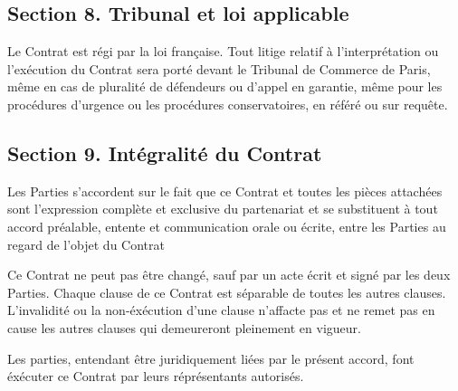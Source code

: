 \documentclass[]{article}
\begin{document}
\hypertarget{section-8.-tribunal-et-loi-applicable}{%
\subsection{Section 8. Tribunal et loi
applicable}\label{section-8.-tribunal-et-loi-applicable}}

Le Contrat est régi par la loi française. Tout litige relatif à
l'interprétation ou l'exécution du Contrat sera porté devant le Tribunal
de Commerce de Paris, même en cas de pluralité de défendeurs ou d'appel
en garantie, même pour les procédures d'urgence ou les procédures
conservatoires, en référé ou sur requête.

\hypertarget{section-9.-intuxe9gralituxe9-du-contrat}{%
\subsection{Section 9. Intégralité du
Contrat}\label{section-9.-intuxe9gralituxe9-du-contrat}}

Les Parties s'accordent sur le fait que ce Contrat et toutes les pièces
attachées sont l'expression complète et exclusive du partenariat et se
substituent à tout accord préalable, entente et communication orale ou
écrite, entre les Parties au regard de l'objet du Contrat

Ce Contrat ne peut pas être changé, sauf par un acte écrit et signé par
les deux Parties. Chaque clause de ce Contrat est séparable de toutes
les autres clauses. L'invalidité ou la non-éxécution d'une clause
n'affacte pas et ne remet pas en cause les autres clauses qui
demeureront pleinement en vigueur.

Les parties, entendant être juridiquement liées par le présent accord,
font éxécuter ce Contrat par leurs réprésentants autorisés.
\end{document}
